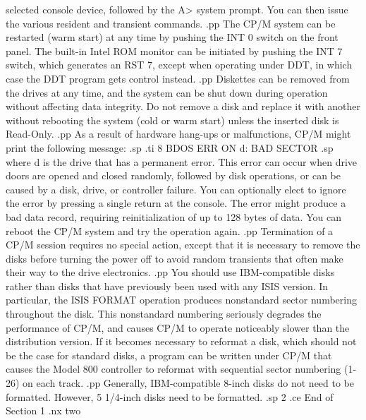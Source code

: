 $$selected console device, followed by the A> system prompt.  You 
can then issue the various resident and transient commands.
.pp
The CP/M system can be restarted (warm start) at any time by pushing the 
INT 0 switch on the front panel.  The built-in Intel ROM monitor can be 
initiated by pushing the INT 7 switch, which generates an RST 7, except when 
operating under DDT, in which case the DDT program gets control instead.
.pp
Diskettes can be removed from the drives at any time, and the system can be 
shut down during operation without affecting data integrity.  Do 
not remove a disk and replace it with another without rebooting the 
system (cold or warm start) unless the inserted disk is Read-Only.
.pp
As a result of hardware hang-ups or malfunctions, CP/M might 
print the following message:
.sp
.ti 8
BDOS ERR ON d: BAD SECTOR
.sp
where d is the drive that has a permanent error.  This error can occur when 
drive doors are opened and closed randomly, followed by disk operations, or 
can be caused by a disk, drive, or controller failure.  You can 
optionally elect to ignore the error by pressing a single return at the 
console.  The error might produce a bad data record, requiring 
reinitialization 
of up to 128 bytes of data.  You can reboot the CP/M system and try 
the operation again.
.pp
Termination of a CP/M session requires no special action, except that it is 
necessary to remove the disks before turning the power off to avoid 
random transients that often make their way to the drive electronics.
.pp
You should use IBM-compatible disks rather than disks 
that have previously been used with any ISIS version.  In particular, the 
ISIS FORMAT operation produces nonstandard sector numbering throughout the 
disk.  This nonstandard numbering seriously degrades the performance of 
CP/M, and causes CP/M to operate noticeably slower than the distribution 
version.  If it becomes necessary to reformat a disk, which 
should not be the case for standard disks, a program can be 
written under CP/M that causes the Model 800 controller to 
reformat with sequential sector numbering (1-26) on each track.
.pp
Generally, IBM-compatible 8-inch disks do not need to be formatted.  
However, 5 1/4-inch disks need to be formatted.
.sp 2
.ce
End of Section 1
.nx two
